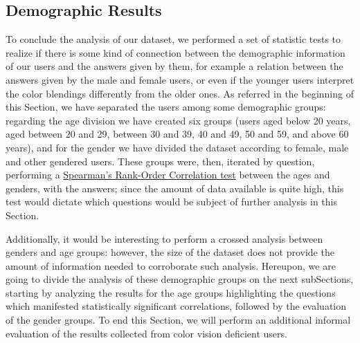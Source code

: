 \subsection{Demographic Results}
\label{subsec:results_demographic}
%
To conclude the analysis of our dataset, we performed a set of statistic tests to realize if there is some kind of connection between the demographic information of our users and the answers given by them, for example a relation between the answers given by
the male and female users, or even if the younger users interpret the color blendings differently from the older ones. As referred in the beginning of this Section, we have separated the users among some demographic groups: regarding the age division we have
created six groups (users aged below 20 years, aged between 20 and 29, between 30 and 39, 40 and 49, 50 and 59, and above 60 years), and for the gender we have divided the dataset according to female, male and other gendered users. These groups were, then, iterated
by question, performing a \ul{Spearman's Rank-Order Correlation test} between the ages and genders, with the answers; since the amount of data available is quite high, this test would dictate which questions would be subject of further analysis in this Section. \par
%
Additionally, it would be interesting to perform a crossed analysis between genders and age groups: however, the size of the dataset does not provide the amount of information needed to corroborate such analysis. Hereupon, we are going to divide the analysis of these demographic
groups on the next subSections, starting by analyzing the results for the age groups highlighting the questions which manifested statistically significant correlations, followed by the evaluation of the gender groups. To end this Section, we will perform an additional
informal evaluation of the results collected from color vision deficient users.
%
